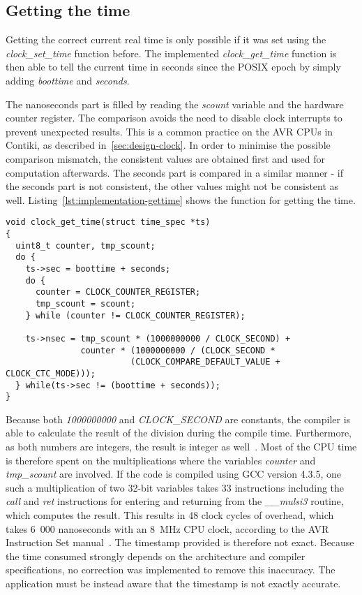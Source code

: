 \subsection{Getting the time}
Getting the correct current real time is only possible if it was set using
the {\it{clock\_set\_time}} function before.
The implemented {\it{clock\_get\_time}} function is then able to tell the
current time in seconds since the POSIX epoch by simply adding {\it{boottime}}
and {\it{seconds}}.

The nanoseconds part is filled by reading the {\it{scount}} variable and the hardware counter register.
The comparison avoids the need to disable clock interrupts to prevent unexpected results.
This is a common practice on the AVR CPUs in Contiki, as described in~\ref{sec:design-clock}.
In order to minimise the possible comparison mismatch,
the consistent values are obtained first and used for computation afterwards.
The seconds part is compared in a similar manner - if the seconds part is not consistent,
the other values might not be consistent as well.
Listing~\ref{lst:implementation-gettime} shows the function for getting the time.
\begin{lstlisting}[caption={Function for getting the time},label={lst:implementation-gettime}]
void clock_get_time(struct time_spec *ts)
{
  uint8_t counter, tmp_scount;
  do {
    ts->sec = boottime + seconds;
    do {
      counter = CLOCK_COUNTER_REGISTER;
      tmp_scount = scount;
    } while (counter != CLOCK_COUNTER_REGISTER);

    ts->nsec = tmp_scount * (1000000000 / CLOCK_SECOND) +
               counter * (1000000000 / (CLOCK_SECOND *
                         (CLOCK_COMPARE_DEFAULT_VALUE + CLOCK_CTC_MODE)));
  } while(ts->sec != (boottime + seconds));
}
\end{lstlisting}
Because both {\it{1000000000}} and {\it{CLOCK\_SECOND}} are constants, the compiler is able to
calculate the result of the division during the compile time.
Furthermore, as both numbers are integers, the result is integer as well~\cite{c99}.
Most of the CPU time is therefore spent on the multiplications where the variables
{\it{counter}} and {\it{tmp\_scount}} are involved.
If the code is compiled using GCC version 4.3.5,
one such a multiplication of two 32-bit variables takes 33 instructions including the {\it{call}} and {\it{ret}}
instructions for entering and returning from the {\it{\_\_mulsi3}} routine, which computes the result.
This results in 48 clock cycles of overhead,
which takes 6~000 nanoseconds with an 8~MHz CPU clock,
according to the AVR Instruction Set manual~\cite{avr-instruction-set}.
The timestamp provided is therefore not exact.
Because the time consumed strongly depends on the architecture and compiler specifications,
no correction was implemented to remove this inaccuracy.
The application must be instead aware that the timestamp is not exactly accurate.


